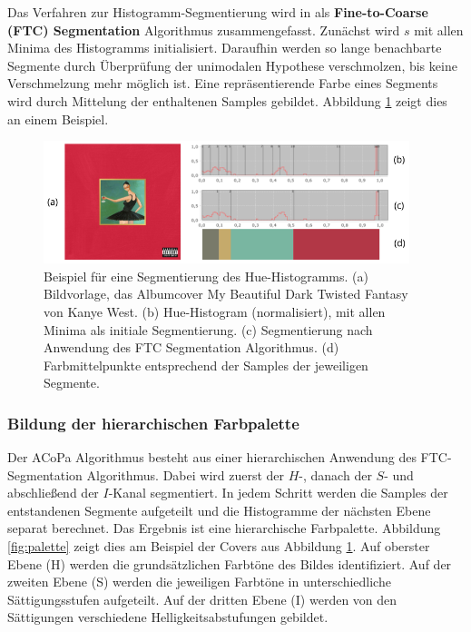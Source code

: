 Das Verfahren zur Histogramm-Segmentierung wird in \citep{ftc} als \textbf{Fine-to-Coarse (FTC) Segmentation} Algorithmus zusammengefasst. Zunächst wird $s$ mit allen Minima des Histogramms initialisiert. Daraufhin werden so lange benachbarte Segmente durch Überprüfung der unimodalen Hypothese verschmolzen, bis keine Verschmelzung mehr möglich ist. Eine repräsentierende Farbe eines Segments wird durch Mittelung der enthaltenen Samples gebildet. Abbildung \ref{fig:h_segmentation} zeigt dies an einem Beispiel.

\begin{figure}[]
\centering
\includegraphics[width=0.95\textwidth]{img/h_segmentation.png}
\caption{Beispiel für eine Segmentierung des Hue-Histogramms. (a) Bildvorlage, das Albumcover \glqq{}My Beautiful Dark Twisted Fantasy\grqq{} von Kanye West. (b) Hue-Histogram (normalisiert), mit allen Minima als initiale Segmentierung. (c) Segmentierung nach Anwendung des FTC Segmentation Algorithmus. (d) Farbmittelpunkte entsprechend der Samples der jeweiligen Segmente.}
\label{fig:h_segmentation}
\end{figure}

\subsubsection{Bildung der hierarchischen Farbpalette}
\label{sec:hierarchische-farbpalette}

Der ACoPa Algorithmus besteht aus einer hierarchischen Anwendung des FTC-Segmentation Algorithmus. Dabei wird zuerst der $H$-, danach der $S$- und abschließend der $I$-Kanal segmentiert. In jedem Schritt werden die Samples der entstandenen Segmente aufgeteilt und die Histogramme der nächsten Ebene separat berechnet. Das Ergebnis ist eine hierarchische Farbpalette. Abbildung \ref{fig:palette} zeigt dies am Beispiel der Covers aus Abbildung \ref{fig:h_segmentation}. Auf oberster Ebene (H) werden die grundsätzlichen Farbtöne des Bildes identifiziert. Auf der zweiten Ebene (S) werden die jeweiligen Farbtöne in unterschiedliche Sättigungsstufen aufgeteilt. Auf der dritten Ebene (I) werden von den Sättigungen verschiedene Helligkeitsabstufungen gebildet.

